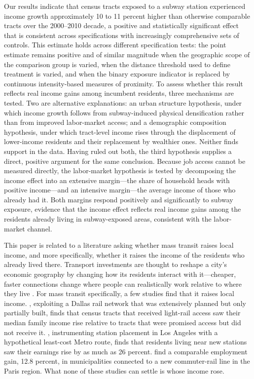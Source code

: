 Our results indicate that census tracts exposed to a subway station experienced income growth approximately 10 to 11 percent higher than otherwise comparable tracts over the 2000–2010 decade, a positive and statistically significant effect that is consistent across specifications with increasingly comprehensive sets of controls. This estimate holds across different specification tests: the point estimate remains positive and of similar magnitude when the geographic scope of the comparison group is varied, when the distance threshold used to define treatment is varied, and when the binary exposure indicator is replaced by continuous intensity-based measures of proximity. To assess whether this result reflects real income gains among incumbent residents, three mechanisms are tested. Two are alternative explanations: an urban structure hypothesis, under which income growth follows from subway-induced physical densification rather than from improved labor-market access; and a demographic composition hypothesis, under which tract-level income rises through the displacement of lower-income residents and their replacement by wealthier ones. Neither finds support in the data. Having ruled out both, the third hypothesis supplies a direct, positive argument for the same conclusion. Because job access cannot be measured directly, the labor-market hypothesis is tested by decomposing the income effect into an extensive margin---the share of household heads with positive income---and an intensive margin---the average income of those who already had it. Both margins respond positively and significantly to subway exposure, evidence that the income effect reflects real income gains among the residents already living in subway-exposed areas, consistent with the labor-market channel.

This paper is related to a literature asking whether mass transit raises local income, and more specifically, whether it raises the income of the residents who already lived there. Transport investments are thought to reshape a city's economic geography by changing how its residents interact with it---cheaper, faster connections change where people can realistically work relative to where they live \citep{duranton2012urban}. For mass transit specifically, a few studies find that it raises local income. \citet{heilmann2018transit}, exploiting a Dallas rail network that was extensively planned but only partially built, finds that census tracts that received light-rail access saw their median family income rise relative to tracts that were promised access but did not receive it. \citet{yen2024rapid}, instrumenting station placement in Los Angeles with a hypothetical least-cost Metro route, finds that residents living near new stations saw their earnings rise by as much as 26 percent. \citet{mayertrevien2017largescale} find a comparable employment gain, 12.8 percent, in municipalities connected to a new commuter-rail line in the Paris region. What none of these studies can settle is whose income rose.


